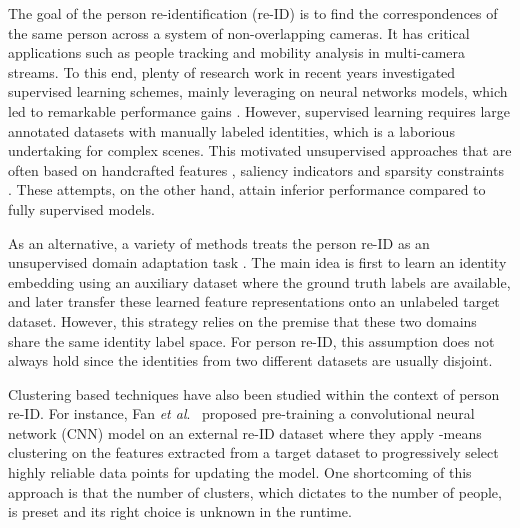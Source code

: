 \documentclass[journal]{IEEEtran}
\newcommand{\etal}{\textit{et al}.}
\begin{document}
The goal of the person re-identification (re-ID) is to find the correspondences of the same person across a system of non-overlapping cameras. It has critical applications such as people tracking and mobility analysis in multi-camera streams. To this end, plenty of research work in recent years investigated supervised learning schemes, mainly leveraging on neural networks models, which led to remarkable performance gains \cite{yang2018person,cho2018pamm,feng2018learning,suh2018part,sun2017svdnet,zhao2017spindle,zhou2017point}. However, supervised learning requires large annotated datasets with manually labeled identities, which is a laborious undertaking for complex scenes. This motivated unsupervised approaches that are often based on handcrafted features \cite{farenzena2010person,liao2015person,lisanti2015person}, saliency indicators \cite{zhao2013unsupervised,wang2014unsupervised} and sparsity constraints \cite{kodirov2015dictionary}. These attempts, on the other hand, attain inferior performance compared to fully supervised models.


As an alternative, a variety of methods treats the person re-ID as an unsupervised domain adaptation task \cite{fan2018unsupervised,peng2016unsupervised,deng2018image}. The main idea is first to learn an identity embedding using an auxiliary dataset where the ground truth labels are available, and later transfer these learned feature representations onto an unlabeled target dataset. However, this strategy relies on the premise that these two domains share the same identity label space. For person re-ID, this assumption does not always hold since the identities from two different datasets are usually disjoint. 


Clustering based techniques have also been studied within the context of person re-ID. For instance, Fan \etal\ \cite{fan2018unsupervised} proposed pre-training a convolutional neural network (CNN) model on an external re-ID dataset where they apply -means clustering on the features extracted from a target dataset to progressively select highly reliable data points for updating the model. One shortcoming of this approach is that the number of clusters, which dictates to the number of people, is preset and its right choice is unknown in the runtime. 
\end{document}
